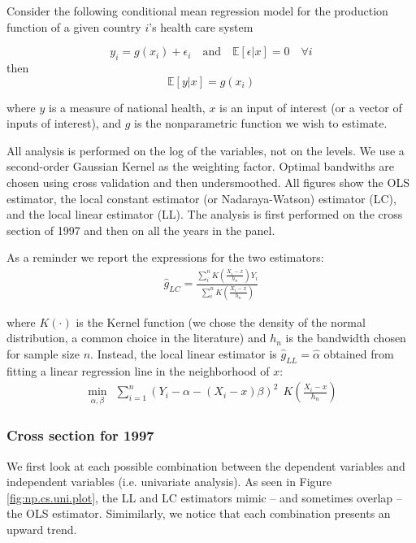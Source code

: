 \documentclass[12pt,a4paper]{article}\usepackage[]{graphicx}\usepackage[]{color}
\begin{document}
Consider the following conditional mean regression model for the production function of a given country $i$'s health care system

$$
y_i = g(x_i) + \epsilon_i \quad \textrm{and} \quad \mathbb{E}[\epsilon|x]=0 \quad \forall i
$$
then
$$
\mathbb{E}[y|x]=g(x_i)
$$

where $y$ is a measure of national health, $x$ is an input of interest (or a vector of inputs of interest), and $g$ is the nonparametric function we wish to estimate.
 
All analysis is performed on the log of the variables, not on the levels. We use a second-order Gaussian Kernel as the weighting factor. Optimal bandwiths are chosen using cross validation and then undersmoothed. All figures show the OLS estimator, the local constant estimator (or Nadaraya-Watson) estimator (LC), and the local linear estimator (LL). The analysis is first performed on the cross section of 1997 and then on all the years in the panel.

As a reminder we report the expressions for the two estimators:
\begin{align*}
\hat{g}_{LC} = \frac{\sum^n_i K \left( \frac{ X_i - x}{h_n} \right) Y_i}{\sum^n_i K \left( \frac{ X_i - x}{h_n} \right)}
\end{align*}

where $K(\cdot)$ is the Kernel function (we chose the density of the normal distribution, a common choice in the literature) and $h_n$ is the bandwidth chosen for sample size $n$. Instead, the local linear estimator is $\hat{g}_{LL} = \hat{\alpha}$ obtained from fitting a linear regression line in the neighborhood of $x$:
\begin{align*}
\min_{\alpha , \beta} \ \ \sum^n_{i=1} (Y_i - \alpha - (X_i - x)\beta)^2 \ \ K \left( \frac{ X_i - x}{h_n} \right)
\end{align*}




 
\subsubsection{Cross section for 1997}
 
We first look at each possible combination between the dependent variables and independent variables (i.e. univariate analysis). As seen in Figure \ref{fig:np.cs.uni.plot}, the LL and LC estimators mimic -- and sometimes overlap -- the OLS estimator. Simimilarly, we notice that each combination presents an upward trend.
 
\end{document}
